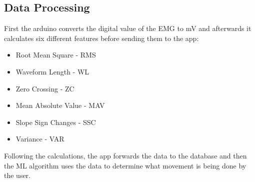 

\subsection{Data Processing}
\label{sec:data_processing}

First the arduino converts the digital value of the \gls{EMG} to mV and afterwards it calculates six different features before sending them to the app: 

\begin{itemize}
  \item Root Mean Square - \gls{RMS}
  \item Waveform Length - \gls{WL}
  \item Zero Crossing - \gls{ZC}
  \item Mean Absolute Value - \gls{MAV}
  \item Slope Sign Changes - \gls{SSC}
  \item Variance - \gls{VAR}
\end{itemize}


Following the calculations, the app forwards the data to the database and then the ML algorithm uses the data to determine what movement is being done by the user.
